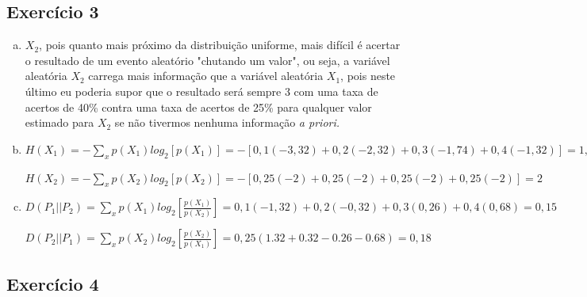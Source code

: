 \documentclass[a4paper, 12pt]{article}
\begin{document}
\subsection*{Exercício 3}

\begin{enumerate}[a)]
\item
$X_2$, pois quanto mais próximo da distribuição uniforme, mais difícil é acertar o resultado de um evento aleatório "chutando um valor", ou seja, a variável aleatória $X_2$ carrega mais informação que a variável aleatória $X_1$, pois neste último eu poderia supor que o resultado será sempre 3 com uma taxa de acertos de 40\% contra uma taxa de acertos de 25\% para qualquer valor estimado para $X_2$ se não tivermos nenhuma informação \em a priori\em .


\item
$H(X_1) = - \sum\limits_x p(X_1)log_2[p(X_1)] = -[0,1(-3,32) + 0,2(-2,32) + 0,3(-1,74) + 0,4(-1,32)] = 1,85$

$H(X_2) = - \sum\limits_x p(X_2)log_2[p(X_2)] = - [0,25 (-2) + 0,25 (-2) + 0,25 (-2) + 0,25(-2)] = 2$


\item
$D(P_1 || P_2) = \sum\limits_x p(X_1)log_2\left[\frac{p(X_1)}{p(X_2)}\right] = 0,1(-1,32) + 0,2(-0,32) + 0,3(0,26) + 0,4(0,68) = 0,15$

$D(P_2 || P_1) = \sum\limits_x p(X_2)log_2\left[\frac{p(X_2)}{p(X_1)}\right] = 0,25(1.32 +  0.32 - 0.26 -0.68) = 0,18$

\end{enumerate}

\subsection*{Exercício 4}
\end{document}
